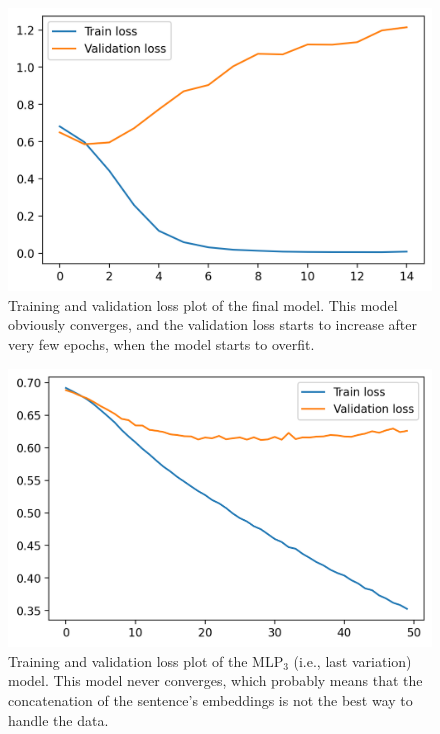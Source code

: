 \documentclass[11pt,a4paper]{article}
\begin{document}
	\begin{figure}[H]
		\centering
		\includegraphics[width=1\columnwidth]{losses_final.png}
		\caption{Training and validation loss plot of the final model. This model obviously converges, and the validation loss starts to increase after very few epochs, when the model starts to overfit.}
		\label{fig:losses_final}
	\end{figure}

	\begin{figure}[H]
		\centering
		\includegraphics[width=1\columnwidth]{losses_mlp.png}
		\caption{Training and validation loss plot of the MLP$_3$ (i.e., last variation) model. This model never converges, which probably means that the concatenation of the sentence's embeddings is not the best way to handle the data.}
		\label{fig:losses_mlp}
	\end{figure}
	
	
	
	
	
	
	
\end{document}
